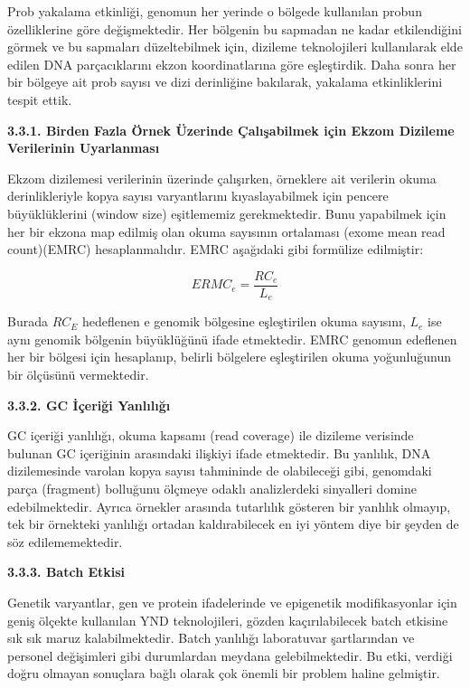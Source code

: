\documentclass[11pt]{article}
\begin{document}
 Prob yakalama etkinliği, genomun her yerinde o bölgede kullanılan probun özelliklerine göre değişmektedir. Her bölgenin bu sapmadan ne kadar etkilendiğini görmek ve bu sapmaları düzeltebilmek için, dizileme teknolojileri kullanılarak elde edilen DNA parçacıklarını ekzon koordinatlarına göre eşleştirdik. Daha sonra her bir bölgeye ait prob sayısı ve dizi derinliğine bakılarak, yakalama etkinliklerini tespit ettik. 

{\bf 3.3.1. Birden Fazla Örnek Üzerinde Çalışabilmek için Ekzom Dizileme Verilerinin Uyarlanması}

Ekzom dizilemesi verilerinin üzerinde çalışırken, örneklere ait verilerin okuma derinlikleriyle kopya sayısı varyantlarını kıyaslayabilmek için pencere büyüklüklerini (window size) eşitlememiz gerekmektedir. Bunu yapabilmek için her bir ekzona map edilmiş olan okuma sayısının ortalaması (exome mean read count)(EMRC) hesaplanmalıdır. EMRC aşağıdaki gibi formülize edilmiştir:

\[ERMC_e = \frac{RC_e}{L_e}\]

Burada $RC_E$ hedeflenen e genomik bölgesine eşleştirilen okuma sayısını, $L_e$ ise aynı genomik bölgenin büyüklüğünü ifade etmektedir. EMRC genomun edeflenen her bir bölgesi için hesaplanıp, belirli bölgelere eşleştirilen okuma yoğunluğunun bir ölçüsünü vermektedir. 

{\bf 3.3.2. GC İçeriği Yanlılığı}

GC içeriği yanlılığı, okuma kapsamı (read coverage) ile dizileme verisinde bulunan GC içeriğinin arasındaki ilişkiyi ifade etmektedir. Bu yanlılık, DNA dizilemesinde varolan kopya sayısı tahmininde de olabileceği gibi, genomdaki parça (fragment) bolluğunu ölçmeye odaklı analizlerdeki sinyalleri domine edebilmektedir. Ayrıca örnekler arasında tutarlılık gösteren bir yanlılık olmayıp, tek bir örnekteki yanlılığı ortadan kaldırabilecek en iyi yöntem diye bir şeyden de söz edilememektedir.

{\bf 3.3.3. Batch Etkisi}

Genetik varyantlar, gen ve protein ifadelerinde ve epigenetik modifikasyonlar için geniş ölçekte kullanılan  YND teknolojileri, gözden kaçırılabilecek batch etkisine sık sık maruz kalabilmektedir. Batch yanlılığı laboratuvar şartlarından ve personel değişimleri gibi durumlardan meydana gelebilmektedir. Bu etki,  verdiği doğru olmayan sonuçlara bağlı olarak çok önemli bir problem haline gelmiştir.
\end{document}
